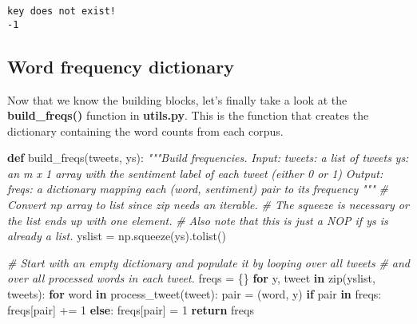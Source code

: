 \documentclass[11pt]{article}
\newenvironment{Shaded}{}{}
\newcommand{\KeywordTok}[1]{\textcolor[rgb]{0.00,0.44,0.13}{\textbf{{#1}}}}
\newcommand{\DecValTok}[1]{\textcolor[rgb]{0.25,0.63,0.44}{{#1}}}
\newcommand{\CommentTok}[1]{\textcolor[rgb]{0.38,0.63,0.69}{\textit{{#1}}}}
\newcommand{\NormalTok}[1]{{#1}}
\newcommand{\ControlFlowTok}[1]{\textcolor[rgb]{0.00,0.44,0.13}{\textbf{{#1}}}}
\newcommand{\OperatorTok}[1]{\textcolor[rgb]{0.40,0.40,0.40}{{#1}}}
\newcommand{\BuiltInTok}[1]{{#1}}
\begin{document}
    \begin{Verbatim}[commandchars=\\\{\}]
key does not exist!
-1
    \end{Verbatim}

    \hypertarget{word-frequency-dictionary}{%
\subsection{Word frequency dictionary}\label{word-frequency-dictionary}}

    Now that we know the building blocks, let's finally take a look at the
\textbf{build\_freqs()} function in \textbf{utils.py}. This is the
function that creates the dictionary containing the word counts from
each corpus.

    \begin{Shaded}
\begin{Highlighting}[]
\KeywordTok{def}\NormalTok{ build\_freqs(tweets, ys):}
    \CommentTok{"""Build frequencies.}
\CommentTok{    Input:}
\CommentTok{        tweets: a list of tweets}
\CommentTok{        ys: an m x 1 array with the sentiment label of each tweet}
\CommentTok{            (either 0 or 1)}
\CommentTok{    Output:}
\CommentTok{        freqs: a dictionary mapping each (word, sentiment) pair to its}
\CommentTok{        frequency}
\CommentTok{    """}
    \CommentTok{\# Convert np array to list since zip needs an iterable.}
    \CommentTok{\# The squeeze is necessary or the list ends up with one element.}
    \CommentTok{\# Also note that this is just a NOP if ys is already a list.}
\NormalTok{    yslist }\OperatorTok{=}\NormalTok{ np.squeeze(ys).tolist()}

    \CommentTok{\# Start with an empty dictionary and populate it by looping over all tweets}
    \CommentTok{\# and over all processed words in each tweet.}
\NormalTok{    freqs }\OperatorTok{=}\NormalTok{ \{\}}
    \ControlFlowTok{for}\NormalTok{ y, tweet }\KeywordTok{in} \BuiltInTok{zip}\NormalTok{(yslist, tweets):}
        \ControlFlowTok{for}\NormalTok{ word }\KeywordTok{in}\NormalTok{ process\_tweet(tweet):}
\NormalTok{            pair }\OperatorTok{=}\NormalTok{ (word, y)}
            \ControlFlowTok{if}\NormalTok{ pair }\KeywordTok{in}\NormalTok{ freqs:}
\NormalTok{                freqs[pair] }\OperatorTok{+=} \DecValTok{1}
            \ControlFlowTok{else}\NormalTok{:}
\NormalTok{                freqs[pair] }\OperatorTok{=} \DecValTok{1}    
    \ControlFlowTok{return}\NormalTok{ freqs}
\end{Highlighting}
\end{Shaded}
\end{document}
